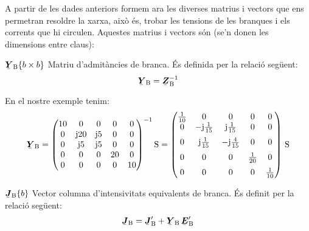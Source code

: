A partir de les dades anteriors formem ara les diverses matrius i
vectors que ens permetran resoldre la xarxa, això és, trobar les
tensions de les branques i els corrents que hi circulen. Aquestes
matrius i vectors són (se'n donen les dimensions entre claus):

\begin{list}{}
{\setlength{\labelwidth}{20mm} \setlength{\leftmargin}{22mm} \setlength{\labelsep}{2mm}}
   \item[$\mcmplx{Y}\ped{B}\{b\times b\}$] Matriu d'admitàncies de branca. És definida per la relació següent:
   \begin{equation}
      \mcmplx{Y}\ped{B} = \mcmplx{Z}\ped{B}^{-1}
   \end{equation}

   En el nostre exemple tenim:
   \[
      \mcmplx{Y}\ped{B} = \begin{pmatrix}
            10 & 0 & 0 & 0 & 0 \\
            0 & \ju 20 & \ju 5 & 0 & 0 \\
            0 & \ju 5 & \ju 5 & 0 & 0 \\
            0 & 0 & 0 & 20 & 0 \\
            0 & 0 & 0 & 0 & 10
      \end{pmatrix} ^{-1}\unit{S} =
      \begin{pmatrix}
            \frac{1}{10} & 0 & 0 & 0 & 0 \\
            0 & -\ju\frac{1}{15} & \ju\frac{1}{15} & 0 & 0 \\[2mm]
            0 & \ju\frac{1}{15} & -\ju\frac{4}{15} & 0 & 0 \\[2mm]
            0 & 0 & 0 & \frac{1}{20} & 0 \\[2mm]
            0 & 0 & 0 & 0 & \frac{1}{10}
      \end{pmatrix}\,\unit{S}
   \]

   \item[$\mcmplx{J}\ped{B}\{b\}$] Vector columna d'intensivitats equivalents de branca. És definit per la relació següent:
   \begin{equation}
      \mcmplx{J}\ped{B} = \mcmplx{J}'\ped{B}  + \mcmplx{Y}\ped{B} \,\mcmplx{E}'\ped{B}
   \end{equation}


\end{list}

